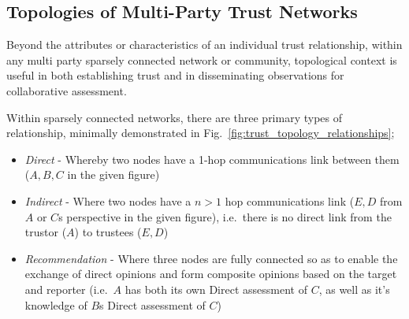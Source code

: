 \subsection{Topologies of Multi-Party Trust Networks}\label{sec:trust_topologies}
Beyond the attributes or characteristics of an individual trust relationship, within any multi party sparsely connected network or community, topological context is useful in both establishing trust and in disseminating observations for collaborative assessment.

Within sparsely connected networks, there are three primary types of relationship, minimally demonstrated in Fig.~\ref{fig:trust_topology_relationships};

\begin{itemize}
  \item \emph{Direct} - Whereby two nodes have a 1-hop communications link between them ($A,B,C$ in the given figure)
  \item \emph{Indirect} - Where two nodes have a $n>1$ hop communications link ($E,D$ from $A$ or $C$s perspective in the given figure), i.e.\ there is no direct link from the trustor ($A$) to trustees ($E,D$)
  \item \emph{Recommendation} -  Where three nodes are fully connected so as to enable the exchange of direct opinions and form composite opinions based on the target and reporter (i.e.\ $A$ has both its own Direct assessment of $C$, as well as it's knowledge of $B$s Direct assessment of $C$)
\end{itemize}

